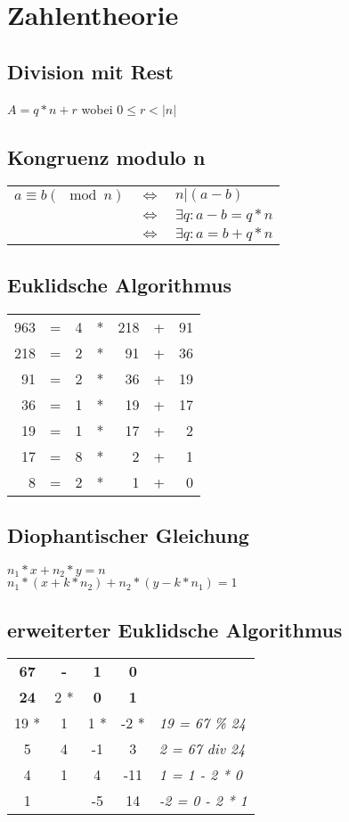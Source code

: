 \section{Zahlentheorie}

\subsection{Division mit Rest}
$ A = q * n + r$ wobei $ 0 \leq r < |n|$

\subsection{Kongruenz modulo n}
\begin{tabular}{lll}
    $ a \equiv b (\mod n)$ & $\iff$ & $n|(a - b)$ \\
    & $\iff$ & $\exists q : a-b = q * n$ \\
    & $\iff$ & $\exists q : a = b + q * n$ \\
\end{tabular}

\subsection{Euklidsche Algorithmus}
\begin{tabular}{rcrcrcr}
    963 & = & 4 & * & 218 & + & 91 \\
    218 & = & 2 & * & 91 & + & 36 \\
    91 & = & 2 & * & 36 & + & 19 \\
    36 & = & 1 & * & 19 & + & 17 \\
    19 & = & 1 & * & 17 & + & 2 \\
    17 & = & 8 & * & 2 & + & 1 \\
    8 & = & 2 & * & 1 & + & 0 \\
\end{tabular}

\subsection{Diophantischer Gleichung}
$n_1 * x + n_2 * y = n$ \\
$n_1 * (x + k * n_2) + n_2 * (y - k * n_1) = 1 $

\subsection{erweiterter Euklidsche Algorithmus}
\begin{tabular}{ccccl}
    \textbf{67} & \textbf{-} & \textbf{1} & \textbf{0} & \\
    \textbf{24} & 2 * & \textbf{0} & \textbf{1} & \\
    19 * & 1 & 1 * & -2 * & \textit{19 = 67 \% 24} \\
    5 & 4 & -1 & 3 & \textit{2 = 67 div 24} \\
    4 & 1 & 4 & -11 & \textit{1 = 1 - 2 * 0} \\
    1 & & -5 & 14 & \textit{-2 = 0 - 2 * 1} \\
\end{tabular} \newline

